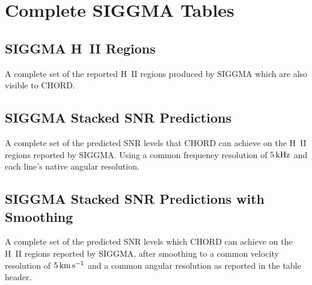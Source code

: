 \section{Complete SIGGMA Tables}
\label{sec:siggma_appendix}

\subsection{SIGGMA H~II Regions}
A complete set of the reported H~II regions produced by SIGGMA which are also visible to CHORD.



\subsection{SIGGMA Stacked SNR Predictions}
A complete set of the predicted SNR levels that CHORD can achieve on the H~II regions reported by SIGGMA. Using a common frequency resolution of \( 5 \, \mathrm{kHz} \) and each line's native angular resolution.



\subsection{SIGGMA Stacked SNR Predictions with Smoothing}

A complete set of the predicted SNR levels which CHORD can achieve on the H~II regions reported by SIGGMA, after smoothing to a common velocity resolution of \( 5 \, \mathrm{km} \, \mathrm{s}^{-1} \) and a common angular resolution as reported in the table header.


